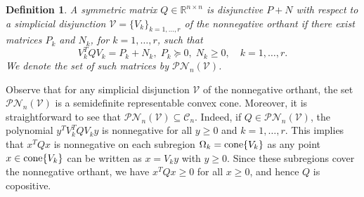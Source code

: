 \documentclass[12pt]{article}
\newcommand{\reals}{\mathbb{R}}
\newcommand{\cone}{\operatornamewithlimits{cone}}
\newcommand{\mcC}{\mathcal{C}}
\newcommand{\mcV}{\mathcal{V}}
\newcommand{\mcPN}{\mathcal{PN}}
\newtheorem{definition}{Definition}%
\theoremstyle{remark}
\newtheorem{remark}{Remark}%
\begin{document}
\begin{definition}\label{def:copos_disos}
A symmetric matrix $Q\in\reals^{n\times n}$ is \emph{disjunctive $P+N$ with respect to a simplicial disjunction} $\mcV=\{V_k\}_{k=1,\ldots,r}$ of the nonnegative orthant if there exist matrices $P_k$ and $N_k$, for $k=1,\ldots,r$, such that
\[V_k^TQV_k=P_k+N_k,\;P_k\succeq 0,\; N_k\ge 0,\quad k=1,\ldots,r.\]
We denote the set of such matrices by $\mcPN_{n}(\mcV)$. 
\end{definition}


Observe that for any simplicial disjunction $\mcV$ of the nonnegative orthant, the set $\mcPN_n(\mcV)$ is a semidefinite representable convex cone. Moreover, it is straightforward to see that $\mcPN_n(\mcV)\subseteq\mcC_n$. Indeed, 
if $Q\in\mcPN_n(\mcV)$,  
the polynomial $y^TV_k^TQV_ky$ is nonnegative for all $y\ge 0$ and $k=1,\ldots,r$. This implies that $x^TQx$ is nonnegative on each subregion $\Omega_k=\cone\{V_k\}$ as any point $x\in\cone\{V_k\}$ can be written as $x=V_ky$ with $y\ge 0$. Since these subregions cover the nonnegative orthant, we have $x^TQx\ge 0$ 
for all $x\ge 0$, and hence $Q$ is copositive.
\end{document}
